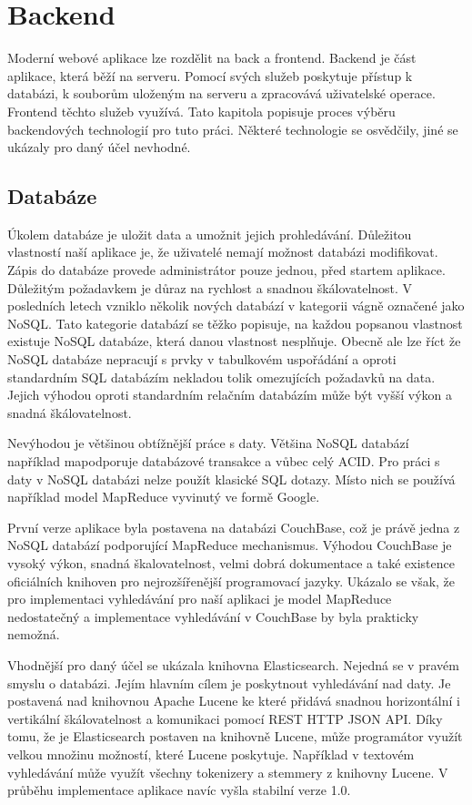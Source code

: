 \chapter{Backend}

Moderní webové aplikace lze rozdělit na back a frontend. Backend je část aplikace, která běží na serveru. Pomocí svých služeb poskytuje přístup k databázi, k souborům uloženým na serveru a zpracovává uživatelské operace. Frontend těchto služeb využívá. Tato kapitola popisuje proces výběru backendových technologií pro tuto práci. Některé technologie se osvědčily, jiné se ukázaly pro daný účel nevhodné.

\section{Databáze}

Úkolem databáze je uložit data a umožnit jejich prohledávání. Důležitou vlastností naší aplikace je, že uživatelé nemají možnost databázi modifikovat. Zápis do databáze provede administrátor pouze jednou, před startem aplikace. Důležitým požadavkem je důraz na rychlost a snadnou škálovatelnost. V posledních letech vzniklo několik nových databází v kategorii vágně označené jako NoSQL\cite{nosql}. Tato kategorie databází se těžko popisuje, na každou popsanou vlastnost existuje NoSQL databáze, která danou vlastnost nesplňuje. Obecně ale lze říct že NoSQL databáze nepracují s prvky v tabulkovém uspořádání a oproti standardním SQL databázím nekladou tolik omezujících požadavků na data. Jejich výhodou oproti standardním relačním databázím může být vyšší výkon a snadná škálovatelnost.

Nevýhodou je většinou obtížnější práce s daty. Většina NoSQL databází například mapodporuje databázové transakce a vůbec celý ACID. Pro práci s daty v NoSQL databázi nelze použít klasické SQL dotazy. Místo nich se používá například model MapReduce\cite{mapreduce} vyvinutý ve formě Google.

První verze aplikace byla postavena na databázi CouchBase\cite{couchbase}, což je právě jedna z NoSQL databází podporující MapReduce mechanismus. Výhodou CouchBase je vysoký výkon, snadná škalovatelnost, velmi dobrá dokumentace a také existence oficiálních knihoven pro nejrozšířenější programovací jazyky. Ukázalo se však, že pro implementaci vyhledávání pro naší aplikaci je model MapReduce nedostatečný a implementace vyhledávání v CouchBase by byla prakticky nemožná.

Vhodnější pro daný účel se ukázala knihovna Elasticsearch\cite{elasticsearch}. Nejedná se v pravém smyslu o databázi. Jejím hlavním cílem je poskytnout vyhledávání nad daty. Je postavená nad knihovnou Apache Lucene ke které přidává snadnou horizontální i vertikální škálovatelnost a komunikaci pomocí REST HTTP JSON API. Díky tomu, že je Elasticsearch postaven na knihovně Lucene\cite{lucene}, může programátor využít velkou množinu možností, které Lucene poskytuje. Například v  textovém vyhledávání může využít všechny tokenizery a stemmery z knihovny Lucene. V průběhu implementace aplikace navíc vyšla stabilní verze 1.0.


